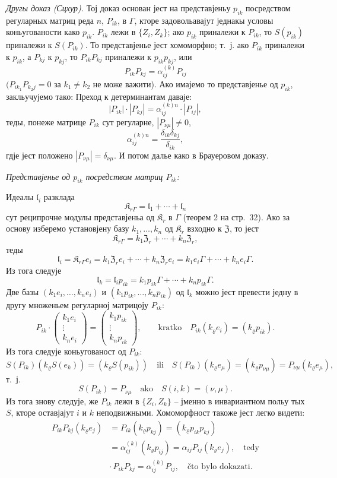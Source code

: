 \documentclass[11pt]{article}
\begin{document}
\emph{Другы доказ (Сцхур).} Тој доказ основан јест на представјеньу \(p_{ik}\) посредством регуларных матриц реда \(n\), \(P_{ik}\), в \(\Gamma\), кторе задовольавајут једнакы условы коньугованости како \(p_{ik}\). \(P_{ik}\) лежи в \(\{Z_i,Z_k\}\); ако \(p_{ik}\) приналежи к \(P_{ik}\), то \(S(p_{ik})\) приналежи к \(S(P_{ik})\). То представјенье јест хомоморфно; т.~ј. ако \(P_{ik}\) приналежи к \(p_{ik}\), а \(P_{kj}\) к \(p_{kj}\), то \(P_{ik}P_{kj}\) приналежи к \(p_{ik}p_{kj}\), или
\[
P_{ik}P_{kj}=\alpha_{ij}^{(k)}P_{ij}
\]
\((P_{ik_1}P_{k_2j}=0\) за \(k_1\neq k_2\) не може важити). Ако имајемо то представјенье од \(p_{ik}\), закльучујемо тако: Преход к детерминантам даваје:
\[
|P_{ik}|\cdot |P_{kj}|=\alpha_{ij}^{(k)n}\cdot |P_{ij}|,
\]
теды, понеже матрице \(P_{ik}\) сут регуларне, \(|P_{\nu\mu}|\ne0\),
\[
\alpha_{ij}^{(k)n}=\frac{\delta_{ik}\delta_{kj}}{\delta_{ik}},
\]
гдје јест положено \(|P_{\nu\mu}|=\delta_{\nu\mu}\). И потом далье како в Брауеровом доказу.

\emph{Представјенье од \(p_{ik}\) посредством матриц \(P_{ik}\):}

Идеалы \(\mathfrak l_i\) разклада
\[
\mathfrak K_{r\Gamma}=\mathfrak l_1+\cdots+\mathfrak l_n
\]
сут реципрочне модулы представјеньа од \(\mathfrak K_r\) в \(\Gamma\) (теорем 2 на стр.~32). Ако за основу изберемо установјену базу \(k_1,\ldots,k_n\) од \(\mathfrak K_r\) взходно к \(\mathfrak Z\), то јест
\[
\mathfrak K_{r\Gamma}=k_1\mathfrak Z_r+\cdots+k_n\mathfrak Z_r,
\]
теды
\[
\mathfrak l_i=\mathfrak K_{r\Gamma}e_i
=k_1\mathfrak Z_r e_i+\cdots+k_n\mathfrak Z_r e_i
=k_1e_i\Gamma+\cdots+k_ne_i\Gamma.
\]
Из тога следује
\[
\mathfrak l_k=\mathfrak l_i p_{ik}
=k_1p_{ik}\Gamma+\cdots+k_np_{ik}\Gamma.
\]
Две базы \((k_1e_i,\ldots,k_ne_i)\) и \((k_1p_{ik},\ldots,k_np_{ik})\) од \(\mathfrak l_k\) можно јест превести једну в другу множеньем регуларној матрицоју \(P_{ik}\):
\[
P_{ik}\cdot
\begin{pmatrix}
k_1e_i\\ \vdots\\ k_ne_i
\end{pmatrix}
=
\begin{pmatrix}
k_1p_{ik}\\ \vdots\\ k_np_{ik}
\end{pmatrix},
\qquad
\text{kratko}\quad
P_{ik}(k_\varrho e_i)=(k_\varrho p_{ik}).
\]
Из тога следује коньугованост од \(P_{ik}\):
\[
S(P_{ik})(k_\varrho S(e_k))=(k_\varrho S(p_{ik}))
\quad\text{ili}\quad
S(P_{ik})(k_\varrho e_\mu)=(k_\varrho p_{\nu\mu})
=P_{\nu\mu}(k_\varrho e_\mu),
\]
т.~ј.
\[
S(P_{ik})=P_{\nu\mu}\quad\text{ako}\quad S(i,k)=(\nu,\mu).
\]
Из тога знову следује, же \(P_{ik}\) лежи в \(\{Z_i,Z_k\}\) -- јменно в инвариантном польу тых \(S\), кторе оставјајут \(i\) и \(k\) неподвижными. Хомоморфност такоже јест легко видети:
\[
\begin{split}
P_{ik}P_{kj}(k_\varrho e_j)
&=P_{ik}(k_\varrho p_{kj})
=(k_\varrho p_{ik}p_{kj})\\
&=\alpha_{ij}^{(k)}(k_\varrho p_{ij})
=\alpha_{ij}P_{ij}(k_\varrho e_j),
\quad\text{tedy}\\
&\cdot\, P_{ik}P_{kj}=\alpha_{ij}^{(k)}P_{ij},
\quad\text{čto bylo dokazati.}
\end{split}
\]
\end{document}
